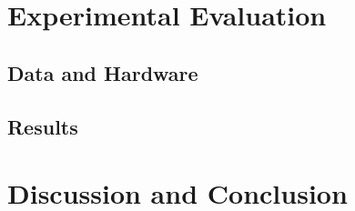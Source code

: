 \documentclass[twocolumn]{article}
\begin{document}
\section{Experimental Evaluation}


\subsection{Data and Hardware}%
\label{sub:Data and Hardware}

\subsection{Results}%


\section{Discussion and Conclusion}
\end{document}

